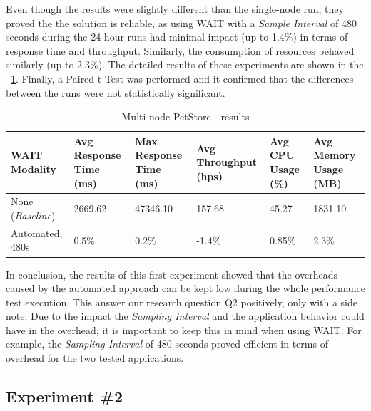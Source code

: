 \documentclass[runningheads,a4paper]{llncs}
\begin{document}
Even though the results were slightly different than the single-node run,
they proved the the solution is reliable, as using WAIT with a
\emph{Sample Interval} of 480 seconds during the 24-hour runs had minimal impact
(up to 1.4\%) in terms of response time and throughput. Similarly, the
consumption of resources behaved similarly (up to 2.3\%). The detailed results of 
these experiments are shown in the \tablename ~\ref{Portal2}. Finally, a
Paired t-Test was performed and it confirmed that the differences between the
runs were not statistically significant.

\begin{table}[!h]
\caption{Multi-node PetStore - results}
\label{Portal2}
\centering
\begin{tabular}{p{}|p{}|p{}|p{}|p{}|p{}}
\hline
\bfseries WAIT Modality & \bfseries Avg Response Time (ms)& \bfseries Max
Response Time (ms)& \bfseries Avg Throughput (hps)& \bfseries Avg CPU Usage
(\%) & \bfseries Avg Memory Usage (MB)\\
\hline
None (\emph{Baseline}) 	& 2669.62	& 47346.10	& 157.68 	& 45.27 	& 1831.10\\
Automated, 480s 		& 0.5\%		& 0.2\%		& -1.4\% 	& 0.85\% 	& 2.3\%\\
\hline
\end{tabular}
\end{table}

In conclusion, the results of this first experiment showed that the overheads
caused by the automated approach can be kept low during the whole performance
test execution. This answer our research question Q2 positively, only with a side
note: Due to the impact the \emph{Sampling Interval} and the application
behavior could have in the overhead, it is important to keep this in mind when
using WAIT. For example, the \emph{Sampling Interval} of 480 seconds
proved efficient in terms of overhead for the two tested applications.

\subsection{Experiment \#2}
\end{document}
